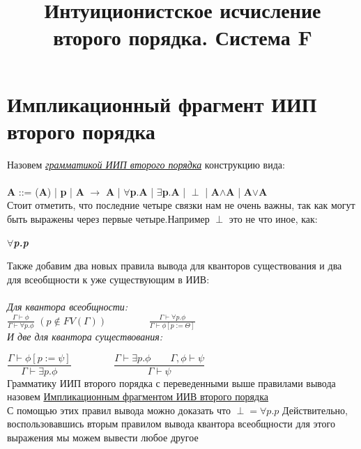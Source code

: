 \documentclass[10pt,a4paper]{article}
\title{Интуиционистское исчисление второго порядка. Система F}
\begin{document}
	\maketitle
	\section{Импликационный фрагмент ИИП второго порядка}
	\large Назовем \textit{\underline{грамматикой ИИП второго порядка}} конструкцию вида: \\ \\
	\textbf{A} ::= 
	 (\textbf{A}) |
	 \textbf{p} |
	 \textbf{A} $\rightarrow$ \textbf{A} |
	 $\forall$\textbf{p}.\textbf{A} | 
	 $\exists$\textbf{p}.\textbf{A} |
	 $\perp$ |
	 \textbf{A}$\land$\textbf{A} |
	 \textbf{A}$\lor$\textbf{A} \\
	
	\large Стоит отметить, что последние четыре связки нам не очень важны, так как могут быть выражены через первые четыре.Например $\perp$ это не что иное, как:
	\begin{center}
			{\textbf{\textsl\textit{\large $\forall$p.p}}} \\
	\end{center}

   
   	\large Также добавим два новых правила вывода для кванторов существования и два для всеобщности к уже существующим в ИИВ: \\ \\
  	
  	\emph{Для квантора всеобщности:} \\ 
  	
  	\huge{$\frac{\Gamma\vdash\phi}{\Gamma\vdash\forall p.\phi}$} \Large$(p\notin FV(\Gamma)) \qquad\qquad$ 
   	\huge{$\frac{\Gamma\vdash\forall p.\phi}{\Gamma\vdash\phi[p:=\Theta]}$}	\\
   	
	\emph{\large И две для квантора существования: \\}
 	
 	\Large{$\dfrac{\Gamma\vdash\phi[p:= \psi]}{\Gamma\vdash\exists p.\phi}\qquad\qquad$} 
	\Large{$\dfrac{\Gamma\vdash\exists p.\phi\qquad\Gamma, \phi\vdash\psi}{\Gamma\vdash\psi}$}\\ 
   	
   	
   	\large Грамматику ИИП второго порядка с переведенными выше правилами вывода назовем \underline{Импликационным фрагментом ИИВ второго порядка} \\
   	\large {С помощью этих правил вывода можно доказать что \textbf{${\perp = \forall p.p}$}
   	Действительно, воспользовавшись вторым правилом вывода квантора всеобщности для этого выражения мы можем вывести любое другое}
   
\end{document}
